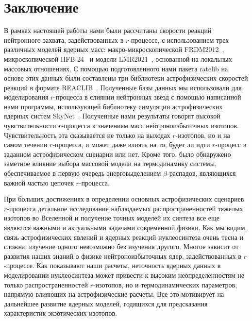 \section*{Заключение}
В рамках настоящей работы нами были рассчитаны скорости реакций нейтронного захвата, задействованных в $r$-процессе, с использованием трех различных моделей ядерных масс: макро-микроскопической FRDM2012~\cite{moller2016}, микроскопической HFB-24~\cite{goriely2013} и модели LMR2021~\cite{vladimirova2022}, основанной на локальных массовых отношениях. С помощью подготовленного нами пакета ratelib на основе этих данных были составлены три библиотеки астрофизических скоростей реакций в формате REACLIB~\cite{reaclib2010}. Полученные базы данных мы использовали для моделирования $r$-процесса в слиянии нейтронных звезд с помощью написанной нами программы, использующей библиотеку симуляции астрофизических ядерных систем SkyNet~\cite{lippuner2015}. Полученные нами результаты говорят высокой чувствительности $r$-процесса к значениям масс нейтроноизбыточных изотопов. Чувствительность эта сказывается не только на выходах $r$-изотопов, но и на самом течении $r$-процесса, и может даже влиять на то, будет ли идти $r$-процесс в заданном астрофизическом сценарии или нет. Кроме того, было обнаружено заметное влияние выбора массовой модели на термодинамику системы, обеспечиваемое в первую очередь энерговыделением $\beta$-распадов, являющихся важной частью цепочек $r$-процесса.

При больших достижениях в определении основных астрофизических сценариев $r$-процесса детальное исследование наблюдаемых распространенностей тяжелых изотопов во Вселенной и получение точных моделей их синтеза все еще являются важными и актуальными задачами современной физики. Как мы видим, связь астрофизических явлений и ядерных реакций нуклеосинтеза очень тесна и сложна, изучение одного невозможно без изучения другого. Многое зависит от развития наших знаний о физике нейтроноизбыточных ядер, задействованных в $r$-процессе. Как показывают наши расчеты, неточность ядерных данных в моделировании нуклеосинтеза может привести к высоким неопределенностям не только распространенностей $r$-изотопов, но и термодинамических параметров, напрямую влияющих на астрофизические расчеты. Все это мотивирует на дальнейшее развитие ядерных моделей, годящихся для предсказания характеристик экзотических изотопов.
